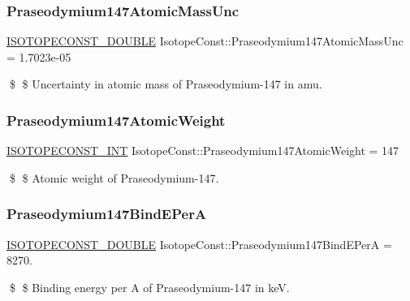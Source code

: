 \subsubsection{\texorpdfstring{Praseodymium147\+Atomic\+Mass\+Unc}{Praseodymium147AtomicMassUnc}}
{\footnotesize\ttfamily \mbox{\hyperlink{group___isotope_const-_macros_ga8f45a7272ce02c0b4c65c44636ed719a}{I\+S\+O\+T\+O\+P\+E\+C\+O\+N\+S\+T\+\_\+\+D\+O\+U\+B\+LE}} Isotope\+Const\+::\+Praseodymium147\+Atomic\+Mass\+Unc = 1.\+7023e-\/05}

\$ \$ Uncertainty in atomic mass of Praseodymium-\/147 in amu. \mbox{\label{group___isotope_const-_praseodymium-_pr147_ga50a378d72a34a39b78acd9bebbfa4955}} 
\subsubsection{\texorpdfstring{Praseodymium147\+Atomic\+Weight}{Praseodymium147AtomicWeight}}
{\footnotesize\ttfamily \mbox{\hyperlink{group___isotope_const-_macros_ga5f18360b3e99483a35c32d789e62621c}{I\+S\+O\+T\+O\+P\+E\+C\+O\+N\+S\+T\+\_\+\+I\+NT}} Isotope\+Const\+::\+Praseodymium147\+Atomic\+Weight = 147}

\$ \$ Atomic weight of Praseodymium-\/147. \mbox{\label{group___isotope_const-_praseodymium-_pr147_gaef4060750b159c6243cac909e29f4d4f}} 
\subsubsection{\texorpdfstring{Praseodymium147\+Bind\+E\+PerA}{Praseodymium147BindEPerA}}
{\footnotesize\ttfamily \mbox{\hyperlink{group___isotope_const-_macros_ga8f45a7272ce02c0b4c65c44636ed719a}{I\+S\+O\+T\+O\+P\+E\+C\+O\+N\+S\+T\+\_\+\+D\+O\+U\+B\+LE}} Isotope\+Const\+::\+Praseodymium147\+Bind\+E\+PerA = 8270.}

\$ \$ Binding energy per A of Praseodymium-\/147 in keV. \mbox{\label{group___isotope_const-_praseodymium-_pr147_ga7f1401044fbdf26d657c4493a27b3ab1}} 
